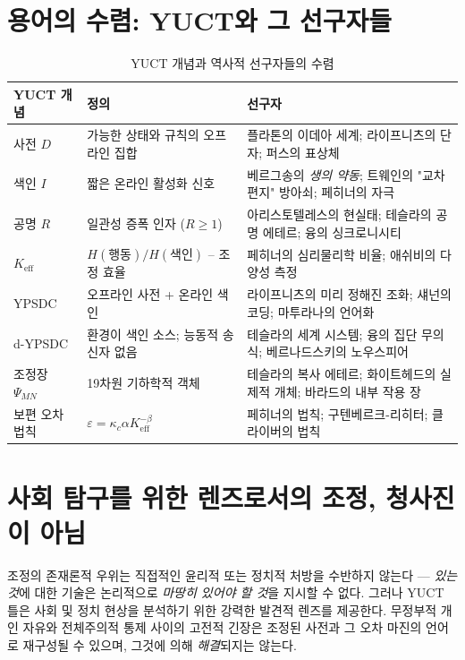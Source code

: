 \documentclass[12pt,a4paper]{article}
\begin{document}
	\section{용어의 수렴: YUCT와 그 선구자들}
	
	\begin{table}[htbp]
		\centering
		\caption{YUCT 개념과 역사적 선구자들의 수렴}
		\label{tab:convergence}
		\small
		\begin{tabular}{p{2.5cm}p{4.5cm}p{4.5cm}}
			\toprule
			\textbf{YUCT 개념} & \textbf{정의} & \textbf{선구자} \\
			\midrule
			사전 \(D\) & 가능한 상태와 규칙의 오프라인 집합 & 플라톤의 이데아 세계; 라이프니츠의 단자; 퍼스의 표상체 \\
			색인 \(I\) & 짧은 온라인 활성화 신호 & 베르그송의 \emph{생의 약동}; 트웨인의 "교차 편지" 방아쇠; 페히너의 자극 \\
			공명 \(R\) & 일관성 증폭 인자 (\(R \ge 1\)) & 아리스토텔레스의 현실태; 테슬라의 공명 에테르; 융의 싱크로니시티 \\
			\(K_{\mathrm{eff}}\) & \(H(\text{행동})/H(\text{색인})\) -- 조정 효율 & 페히너의 심리물리학 비율; 애쉬비의 다양성 측정 \\
			YPSDC & 오프라인 사전 + 온라인 색인 & 라이프니츠의 미리 정해진 조화; 섀넌의 코딩; 마투라나의 언어화 \\
			d-YPSDC & 환경이 색인 소스; 능동적 송신자 없음 & 테슬라의 세계 시스템; 융의 집단 무의식; 베르나드스키의 노우스피어 \\
			조정장 \(\Psi_{MN}\) & 19차원 기하학적 객체 & 테슬라의 복사 에테르; 화이트헤드의 실제적 개체; 바라드의 내부 작용 장 \\
			보편 오차 법칙 & \(\varepsilon = \kappa_c \alpha K_{\mathrm{eff}}^{-\beta}\) & 페히너의 법칙; 구텐베르크-리히터; 클라이버의 법칙 \\
			\bottomrule
		\end{tabular}
	\end{table}
	
	\section{사회 탐구를 위한 렌즈로서의 조정, 청사진이 아님}
	\label{sec:social-lens}
	
	조정의 존재론적 우위는 직접적인 윤리적 또는 정치적 처방을 수반하지 않는다 — \emph{있는 것}에 대한 기술은 논리적으로 \emph{마땅히 있어야 할 것}을 지시할 수 없다. 그러나 YUCT 틀은 사회 및 정치 현상을 분석하기 위한 강력한 발견적 렌즈를 제공한다. 무정부적 개인 자유와 전체주의적 통제 사이의 고전적 긴장은 조정된 사전과 그 오차 마진의 언어로 재구성될 수 있으며, 그것에 의해 \emph{해결}되지는 않는다.
	
\end{document}
